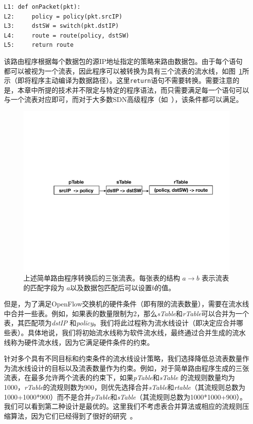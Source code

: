 \documentclass{ctexart}
\newcommand{\codeword}[1]{\texttt{\small{#1}}}
\begin{document}
\begin{small}
\begin{verbatim}
L1: def onPacket(pkt):
L2:     policy = policy(pkt.srcIP)
L3:     dstSW = switch(pkt.dstIP)
L4:     route = route(policy, dstSW)
L5:     return route
\end{verbatim}
\end{small}

该路由程序根据每个数据包的源IP地址指定的策略来路由数据包。由于每个语句都可以被视为一个流表，因此程序可以被转换为具有三个流表的流水线，如图~\ref{fig:srp}所示（即将程序主动编译为数据路径）。这里\codeword{return}语句不需要转换。需要注意的是，本章中所提的技术并不限定与特定的程序语法，而只需要满足每一个语句可以与一个流表对应即可，而对于大多数SDN高级程序（如~\cite{snap,sivaraman2016packet}），该条件都可以满足。

\begin{figure}[!htbp]
\includegraphics[width=0.6\linewidth]{figures/lp-65.pdf}
\centering
\vspace{-3mm}
\caption{\small 上述简单路由程序转换后的三张流表。每张表的结构 $a \rightarrow b$ 表示流表的匹配字段为 $a$以及数据包匹配后可以设置$b$的值。}
\label{fig:srp}
\end{figure}

但是，为了满足OpenFlow交换机的硬件条件（即有限的流表数量），需要在流水线中合并一些表。例如，如果表的数量限制为2，那么\emph{sTable}和\emph{rTable}可以合并为一个表，其匹配项为\emph{dstIP} 和\emph{policy}。我们将此过程称为流水线设计（即决定应合并哪些表）。具体地说，我们将初始流水线称为软件流水线，最终通过合并生成的流水线称为硬件流水线，因为它满足硬件条件的约束。

针对多个具有不同目标和约束条件的流水线设计策略，我们选择降低总流表数量作为流水线设计的目标以及流表数量作为约束。例如，对于简单路由程序生成的三张流表，在最多允许两个流表的约束下，如果\emph{pTable}和\emph{sTable} 的流规则数量均为1000，\emph{rTable}的流规则数为900，则优先选择合并\emph{sTable}和\emph{rtable}（其流规则总数为1000+1000*900）而不是合并\emph{pTable}和\emph{sTable}（其流规则总数为1000*1000+900）。我们可以看到第二种设计是最优的。这里我们不考虑表合并算法或相应的流规则压缩算法，因为它们已经得到了很好的研究~\cite{ge2015h,gupta2001algorithms}。
\end{document}
